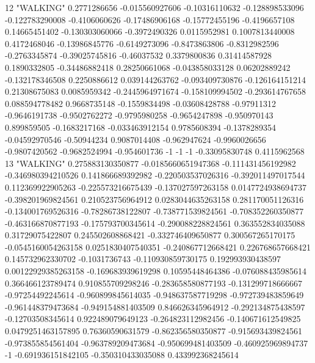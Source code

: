 12 "WALKING" 0.2771286656 -0.015560927606 -0.10316110632 -0.128898533096 -0.122783290008 -0.4106060626 -0.17486906168 -0.15772455196 -0.4196657108 0.14665451402 -0.130303060066 -0.3972490326 0.0115952981 0.1007813440008 0.4172468046 -0.13986845776 -0.6149273096 -0.8473863806 -0.8312982596 -0.2763345874 -0.39025745816 -0.46037532 0.3379800836 0.31414587928 0.1890332805 -0.34486882418 0.28250661068 -0.043858033128 0.06202889242 -0.132178346508 0.2250886612 0.039144263762 -0.093409730876 -0.126164151214 0.21308675083 0.0085959342 -0.2445964971674 -0.158109994502 -0.293614767658 0.088594778482 0.9668735148 -0.1559834498 -0.03608428788 -0.97911312 -0.9646191738 -0.9502762272 -0.9795980258 -0.9654247898 -0.950970143 0.899859505 -0.1683217168 -0.033463912154 0.9785608394 -0.1378289354 -0.04592970546 -0.50944234 0.9087014408 -0.962947624 -0.9960026656 -0.9807420562 -0.9682524994 -0.954601736 -1 -1 -1 -0.33095830748 0.4115962568
13 "WALKING" 0.275883130350877 -0.0185660651947368 -0.111431456192982 -0.346980394210526 0.141866689392982 -0.220503537026316 -0.392011497017544 0.112369922905263 -0.225573216675439 -0.137027597263158 0.0147724938694737 -0.398201969824561 0.210523756964912 0.0283044635263158 0.281170051126316 -0.134001769526316 -0.78286738122807 -0.738771539824561 -0.708352260350877 -0.463166870877193 -0.175793700345614 -0.290088228824561 0.363552834035088 0.31729075422807 0.245502608868421 -0.332746409650877 0.300567265170175 -0.0545160054263158 0.0251830407540351 -0.240867712668421 0.226768657668421 0.145732962330702 -0.1031736743 -0.110930859730175 0.192993930438597 0.00122929385263158 -0.169683939619298 0.10595448464386 -0.076088435985614 0.366466123789474 0.910855709298246 -0.283658580877193 -0.131299718666667 -0.97254492245614 -0.960899845614035 -0.948637587719298 -0.972739483859649 -0.961448379473684 -0.949154881403509 0.846626345964912 -0.292134875438597 -0.12703508345614 0.922489079649123 -0.264823112982456 -0.140671612549825 0.0479251463157895 0.76360590631579 -0.862356580350877 -0.915693439824561 -0.973855854561404 -0.963789209473684 -0.950699481403509 -0.460925969894737 -1 -0.691936151842105 -0.350310433035088 0.433992368245614

